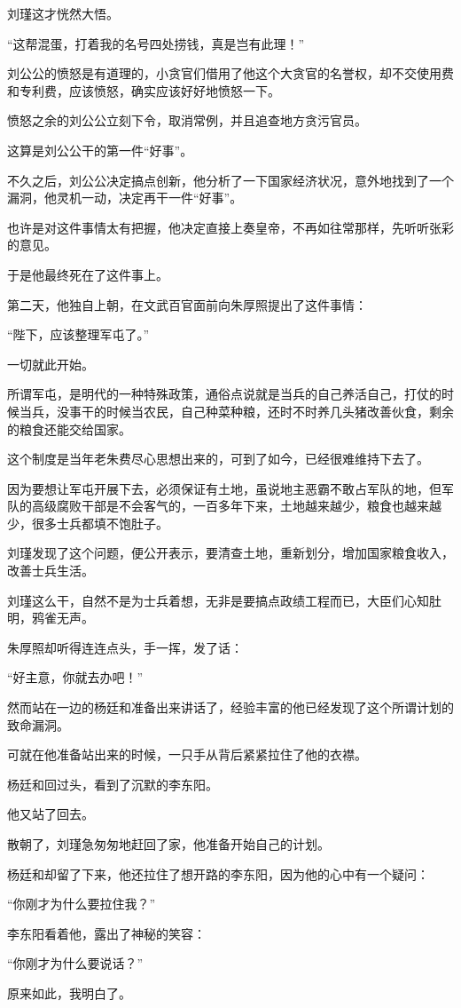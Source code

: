 \begin{multicols}{\theparacolNo}
		刘瑾这才恍然大悟。

		“这帮混蛋，打着我的名号四处捞钱，真是岂有此理！”

		刘公公的愤怒是有道理的，小贪官们借用了他这个大贪官的名誉权，却不交使用费和专利费，应该愤怒，确实应该好好地愤怒一下。

		愤怒之余的刘公公立刻下令，取消常例，并且追查地方贪污官员。

		这算是刘公公干的第一件“好事”。

		不久之后，刘公公决定搞点创新，他分析了一下国家经济状况，意外地找到了一个漏洞，他灵机一动，决定再干一件“好事”。

		也许是对这件事情太有把握，他决定直接上奏皇帝，不再如往常那样，先听听张彩的意见。

		于是他最终死在了这件事上。

		第二天，他独自上朝，在文武百官面前向朱厚照提出了这件事情：

		“陛下，应该整理军屯了。”

		一切就此开始。

		所谓军屯，是明代的一种特殊政策，通俗点说就是当兵的自己养活自己，打仗的时候当兵，没事干的时候当农民，自己种菜种粮，还时不时养几头猪改善伙食，剩余的粮食还能交给国家。

		这个制度是当年老朱费尽心思想出来的，可到了如今，已经很难维持下去了。

		因为要想让军屯开展下去，必须保证有土地，虽说地主恶霸不敢占军队的地，但军队的高级腐败干部是不会客气的，一百多年下来，土地越来越少，粮食也越来越少，很多士兵都填不饱肚子。

		刘瑾发现了这个问题，便公开表示，要清查土地，重新划分，增加国家粮食收入，改善士兵生活。

		刘瑾这么干，自然不是为士兵着想，无非是要搞点政绩工程而已，大臣们心知肚明，鸦雀无声。

		朱厚照却听得连连点头，手一挥，发了话：

		“好主意，你就去办吧！”

		然而站在一边的杨廷和准备出来讲话了，经验丰富的他已经发现了这个所谓计划的致命漏洞。

		可就在他准备站出来的时候，一只手从背后紧紧拉住了他的衣襟。

		杨廷和回过头，看到了沉默的李东阳。

		他又站了回去。

		散朝了，刘瑾急匆匆地赶回了家，他准备开始自己的计划。

		杨廷和却留了下来，他还拉住了想开路的李东阳，因为他的心中有一个疑问：

		“你刚才为什么要拉住我？”

		李东阳看着他，露出了神秘的笑容：

		“你刚才为什么要说话？”

		原来如此，我明白了。
		\ifnum{}
	\end{multicols}
\fi
\newpage
